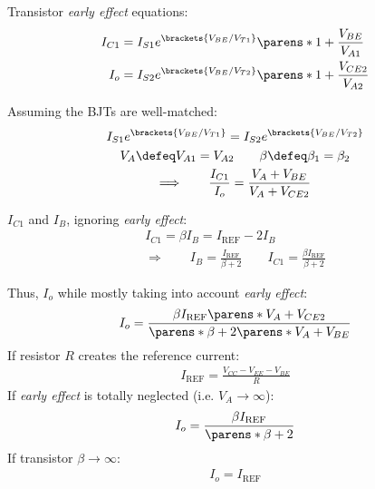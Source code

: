 \begin{multicols}{2}
\begin{CheatsheetEntryFrame}

        Transistor \emph{early effect} equations:
        \begin{align*}
            I_{C1}
            &= I_{S1} e^{\brackets{{V_{BE}} \mathbin{/} {V_{T1}}}}
            \parens*{1 + \frac{V_{BE}}{V_{A1}}}
            \\
            I_o
            &= I_{S2} e^{\brackets{{V_{BE}} \mathbin{/} {V_{T2}}}}
            \parens*{1 + \frac{V_{CE2}}{V_{A2}}}
        \end{align*}

        Assuming the BJTs are well-matched:
        \begin{gather*}
            I_{S1} e^{\brackets{{V_{BE}} \mathbin{/} {V_{T1}}}}
            = I_{S2} e^{\brackets{{V_{BE}} \mathbin{/} {V_{T2}}}}
            \\
            V_A \defeq V_{A1} = V_{A2}
            \qquad
            \beta \defeq \beta_1 = \beta_2
            \\
            \Longrightarrow\qquad
            \frac{I_{C1}}{I_o}
            = \frac{V_A + V_{BE}}{V_A + V_{CE2}}
        \end{gather*}

        $I_{C1}$ and $I_B$, ignoring \emph{early effect}:
        \begin{gather*}
            I_{C1}
            = \beta I_B
            = I_\text{REF} - 2 I_B
            \\
            \Longrightarrow\qquad
            I_B = \frac{I_\text{REF}}{\beta + 2}
            \qquad
            I_{C1} = \frac{\beta I_\text{REF}}{\beta + 2}
        \end{gather*}

        Thus, $I_o$ while mostly taking into account \emph{early effect}:
        \begin{gather*}
            I_o
            = \frac{
                \beta I_\text{REF} \parens*{V_A + V_{CE2}}
            }{
                \parens*{\beta + 2} \parens*{V_A + V_{BE}}
            }
        \end{gather*}
        If resistor $R$ creates the reference current:
        \begin{gather*}
            I_\text{REF} = \frac{V_{CC} - V_{EE} - V_{BE}}{R}
        \end{gather*}
        If \emph{early effect} is totally neglected (i.e. $V_A \to \infty$):
        \begin{gather*}
            I_o
            = \frac{
                \beta I_\text{REF}
            }{
                \parens*{\beta + 2}
            }
        \end{gather*}
        If transistor $\beta \to \infty$:
        \begin{gather*}
            I_o = I_\text{REF}
        \end{gather*}


\end{CheatsheetEntryFrame}
\end{multicols}
